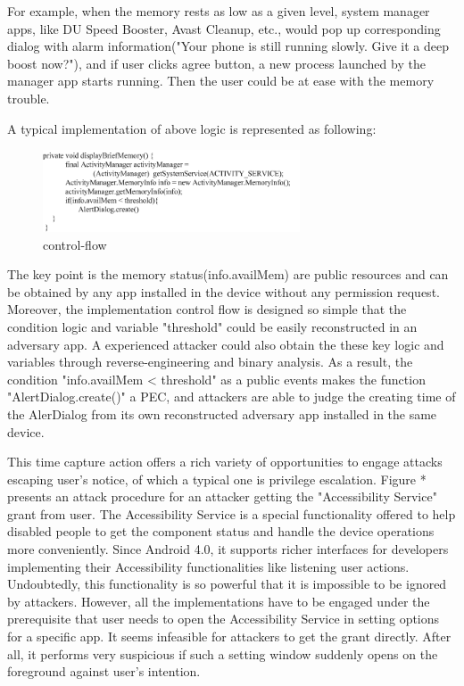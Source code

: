 \documentclass{sig-alternate-05-2015}
\begin{document}
For example, when the memory rests as low as a given level, system manager apps, like DU Speed Booster, Avast Cleanup, etc., would pop up corresponding dialog with alarm information("Your phone is still running slowly. Give it a deep boost now?"), and if user clicks agree button, a new process launched by the manager app starts running. Then the user could be at ease with the memory trouble.

A typical implementation of above logic is represented as following:
\begin{figure}
\centering
\includegraphics[width = 3.0in]{code1.png}
\caption{\label{}control-flow}
\end{figure}

The key point is the memory status(info.availMem) are public resources and can be obtained by any app installed in the device without any permission request. Moreover, the implementation control flow is designed so simple that 
the condition logic and variable "threshold" could be easily reconstructed in an adversary app. A experienced attacker could also obtain the these key logic and variables through reverse-engineering and binary analysis. As a result, the condition "info.availMem < threshold" as a public events makes the function "AlertDialog.create()" a PEC, and attackers are able to judge the creating time of the AlerDialog from its own reconstructed adversary app installed in the same device.

This time capture action offers a rich variety of opportunities to engage attacks escaping user's notice, of which a typical one is privilege escalation. Figure * presents an attack procedure for an attacker getting the "Accessibility Service" grant from user. The Accessibility Service is a special functionality offered to help disabled people to get the component status and handle the device operations more conveniently. Since Android 4.0, it supports richer interfaces for developers implementing their Accessibility functionalities like listening user actions. Undoubtedly, this functionality is so powerful that it is impossible to be ignored by attackers. However, all the implementations have to be engaged under the prerequisite that user needs to open the Accessibility Service in setting options for a specific app. It seems infeasible for attackers to get the grant directly. After all, it performs very suspicious if such a setting window suddenly opens on the foreground against user's intention.
\end{document}
